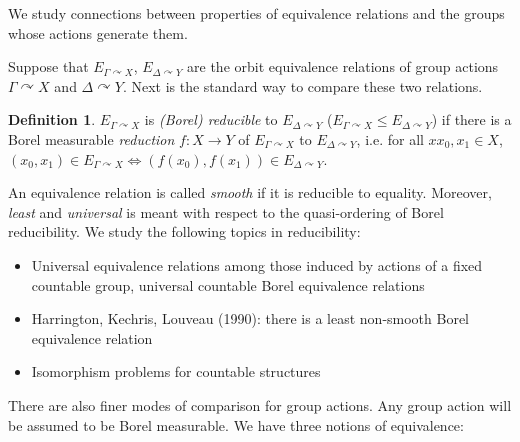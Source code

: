 \documentclass[10pt]{amsart}
\newcommand{\ZZ}{\mathbb{Z}}
\theoremstyle{definition}
\newtheorem*{definition*}{Definition}
\theoremstyle{remark}
\begin{document}
We study connections between properties of equivalence relations and the groups whose actions generate them. 


Suppose that $E_{\Gamma\curvearrowright X}$, $E_{\Delta\curvearrowright Y}$ are the orbit equivalence relations of group actions $\Gamma\curvearrowright X$ and $\Delta\curvearrowright Y$. 
Next is the standard way to compare these two relations. 

\begin{definition*} 
$E_{\Gamma\curvearrowright X}$ is \emph{(Borel) reducible} to $E_{\Delta\curvearrowright Y}$ ($E_{\Gamma\curvearrowright X}\leq E_{\Delta\curvearrowright  Y}$) if there is a Borel measurable \emph{reduction} $f\colon X\rightarrow Y$ of $E_{\Gamma\curvearrowright X}$ to $E_{\Delta\curvearrowright Y}$, i.e. for all $xx_0,x_1\in X$, 
$(x_0,x_1)\in E_{\Gamma\curvearrowright X}\Longleftrightarrow (f(x_0),f(x_1))\in E_{\Delta\curvearrowright Y}$. 
\end{definition*} 

An equivalence relation is called \emph{smooth} if it is reducible to equality. 
Moreover, \emph{least} and \emph{universal} is meant with respect to the quasi-ordering of Borel reducibility. 
We study the following topics in reducibility: 

\begin{itemize} 
\item 
Universal equivalence relations among those induced by actions of a fixed countable group, 
universal countable Borel equivalence relations 
\item 
Harrington, Kechris, Louveau (1990): there is a least non-smooth Borel equivalence relation 
\item 
Isomorphism problems for countable structures 
\end{itemize} 

There are also finer modes of comparison for group actions. Any group action will be assumed to be Borel measurable. 
We have three notions of equivalence: 
\end{document}
